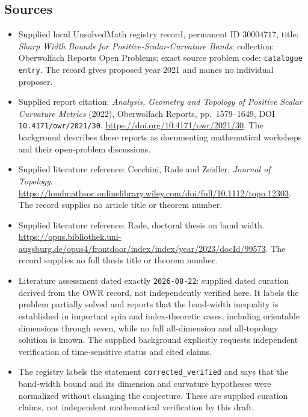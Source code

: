 \documentclass[11pt]{article}
\begin{document}
\subsection{Sources}
\begin{itemize}
\item Supplied local UnsolvedMath registry record, permanent ID \(30004717\), title: \emph{Sharp Width Bounds for Positive-Scalar-Curvature Bands}; collection: Oberwolfach Reports Open Problems; exact source problem code: \texttt{catalogue entry}. The record gives proposed year 2021 and names no individual proposer.
\item Supplied report citation: \emph{Analysis, Geometry and Topology of Positive Scalar Curvature Metrics} (2022), Oberwolfach Reports, pp.\ 1579--1649, DOI \texttt{10.4171/owr/2021/30}. \url{https://doi.org/10.4171/owr/2021/30}. The background describes these reports as documenting mathematical workshops and their open-problem discussions.
\item Supplied literature reference: Cecchini, Rade and Zeidler, \emph{Journal of Topology}. \url{https://londmathsoc.onlinelibrary.wiley.com/doi/full/10.1112/topo.12303}. The record supplies no article title or theorem number.
\item Supplied literature reference: Rade, doctoral thesis on band width. \url{https://opus.bibliothek.uni-augsburg.de/opus4/frontdoor/index/index/year/2023/docId/99573}. The record supplies no full thesis title or theorem number.
\item Literature assessment dated exactly \texttt{2026-08-22}: supplied dated curation derived from the OWR record, not independently verified here. It labels the problem partially solved and reports that the band-width inequality is established in important spin and index-theoretic cases, including orientable dimensions through seven, while no full all-dimension and all-topology solution is known. The supplied background explicitly requests independent verification of time-sensitive status and cited claims.
\item The registry labels the statement \texttt{corrected\_verified} and says that the band-width bound and its dimension and curvature hypotheses were normalized without changing the conjecture. These are supplied curation claims, not independent mathematical verification by this draft.
\end{itemize}
\end{document}
